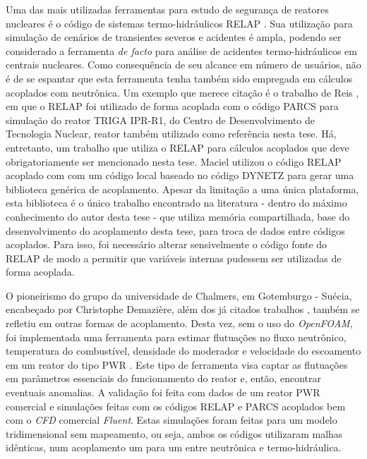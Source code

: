 Uma das mais utilizadas ferramentas para estudo de segurança de reatores nucleares é o
código de sistemas termo-hidráulicos RELAP \cite{Relap2003}. Sua utilização para simulação
de cenários de transientes severos e acidentes é ampla, podendo ser considerado a
ferramenta \textit{de facto} para análise de acidentes termo-hidráulicos em centrais nucleares.
Como consequência de seu alcance em número de usuários, não é de se espantar que esta ferramenta
tenha também sido empregada em cálculos acoplados com neutrônica. Um exemplo que merece citação
é o trabalho de Reis \cite{Reis2015}, em que o RELAP foi utilizado de forma acoplada com
o código PARCS para simulação do reator TRIGA IPR-R1, do Centro de Desenvolvimento de
Tecnologia Nuclear, reator também utilizado como referência nesta tese. Há, entretanto, um
trabalho que utiliza o RELAP para cálculos acoplados que deve obrigatoriamente ser
mencionado nesta tese. Maciel \cite{Maciel2011} utilizou o código RELAP acoplado com
com um código local baseado no código DYNETZ para gerar uma biblioteca genérica de
acoplamento. Apesar da limitação a uma única plataforma, esta biblioteca é o único trabalho
encontrado na literatura - dentro do máximo conhecimento do autor desta tese - que utiliza
memória compartilhada, base do desenvolvimento do acoplamento desta tese, para troca
de dados entre códigos acoplados. Para isso, foi necessário alterar sensivelmente
o código fonte do RELAP de modo a permitir que variáveis internas pudessem ser utilizadas
de forma acoplada. 

O pioneirismo do grupo da universidade de Chalmers, em Gotemburgo - Suécia, encabeçado
por Christophe Demazière, além dos já citados trabalhos \cite{Jareteg2012, Jareteg2014},
também se refletiu em outras formas de acoplamento. Desta vez, sem o uso do \textit{OpenFOAM},
foi implementada uma ferramenta para estimar flutuações no fluxo neutrônico, temperatura
do combustível, densidade do moderador e velocidade do escoamento em um reator do tipo PWR
\cite{Larsson2012}. Este tipo de ferramenta visa captar as flutuações em parâmetros
essenciais do funcionamento do reator e, então, encontrar eventuais anomalias. A validação
foi feita com dados de um reator PWR comercial e simulações feitas com os códigos
RELAP e PARCS acoplados bem com o \textit{CFD} comercial \textit{Fluent}. Estas simulações
foram feitas para um modelo tridimensional sem mapeamento, ou seja, ambos os códigos
utilizaram malhas idênticas, num acoplamento um para um entre neutrônica e termo-hidráulica.

